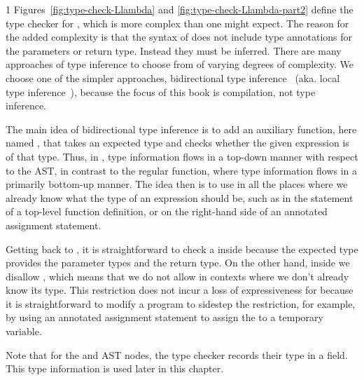 \documentclass[7x10]{TimesAPriori_MIT}%
\def\pythonEd{1}
\def\edition{0}
\numberwithin{theorem}{chapter}
\numberwithin{definition}{chapter}
\numberwithin{equation}{chapter}
\begin{document}
{\if\edition\pythonEd
%
Figures~\ref{fig:type-check-Llambda} and
\ref{fig:type-check-Llambda-part2} define the type checker for
\LangLam{}, which is more complex than one might expect. The reason
for the added complexity is that the syntax of  does not
include type annotations for the parameters or return type.  Instead
they must be inferred. There are many approaches of type inference to
choose from of varying degrees of complexity. We choose one of the
simpler approaches, bidirectional type inference~\citep{Dunfield:2021}
(aka. local type inference~\citep{Pierce:2000}), because the focus of
this book is compilation, not type inference.

The main idea of bidirectional type inference is to add an auxiliary
function, here named , that takes an expected type
and checks whether the given expression is of that type.  Thus, in
, type information flows in a top-down manner with
respect to the AST, in contrast to the regular 
function, where type information flows in a primarily bottom-up
manner.
%
The idea then is to use  in all the places where we
already know what the type of an expression should be, such as in the
 statement of a top-level function definition, or on the
right-hand side of an annotated assignment statement.

Getting back to , it is straightforward to check a
 inside  because the expected type
provides the parameter types and the return type.  On the other hand,
inside  we disallow , which means
that we do not allow  in contexts where we don't already
know its type. This restriction does not incur a loss of
expressiveness for \LangLam{} because it is straightforward to modify
a program to sidestep the restriction, for example, by using an
annotated assignment statement to assign the  to a
temporary variable.

Note that for the  and  AST nodes, the type
checker records their type in a  field. This type
information is used later in this chapter.
%
\fi}
\end{document}
